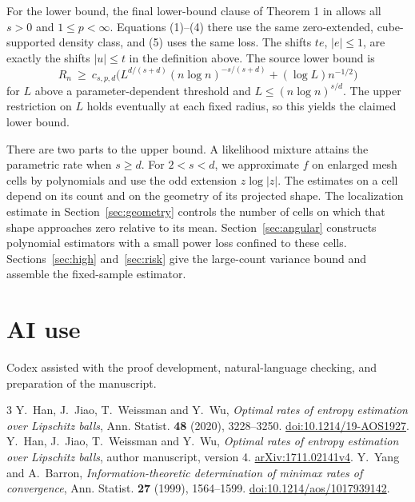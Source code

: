 \documentclass[11pt,reqno]{amsart}
\numberwithin{equation}{section}
\begin{document}
For the lower bound, the final lower-bound clause of Theorem 1 in
\cite{HJWWv4} allows all \(s>0\) and \(1\le p<\infty\).
Equations (1)--(4) there use the same zero-extended, cube-supported
density class, and (5) uses the same loss. The shifts \(te\), \(|e|\le1\),
are exactly the shifts \(|u|\le t\) in the definition above. The source lower bound is
\[
 R_n\ \ge\ c_{s,p,d}
 \bigl(L^{d/(s+d)}(n\log n)^{-s/(s+d)}+(\log L)n^{-1/2}\bigr)
\]
for \(L\) above a parameter-dependent threshold and
\(L\le(n\log n)^{s/d}\). The upper restriction on \(L\) holds
eventually at each fixed radius, so this yields the claimed lower bound.

There are two parts to the upper bound. A likelihood mixture
attains the parametric rate when \(s\ge d\). For \(2<s<d\), we
approximate \(f\) on enlarged mesh cells by polynomials and use
the odd extension \(z\log|z|\). The estimates on a cell depend
on its count and on the geometry of its projected shape. The
localization estimate in Section~\ref{sec:geometry} controls the
number of cells on which that shape approaches zero relative to
its mean. Section~\ref{sec:angular} constructs polynomial
estimators with a small power loss confined to these cells.
Sections~\ref{sec:high} and~\ref{sec:risk} give the large-count
variance bound and assemble the fixed-sample estimator.







\section*{AI use}
Codex assisted with the proof development, natural-language
checking, and preparation of the manuscript.

\begin{thebibliography}{3}
Y.~Han, J.~Jiao, T.~Weissman and Y.~Wu,
\textit{Optimal rates of entropy estimation over Lipschitz balls},
Ann. Statist. \textbf{48} (2020), 3228--3250.
\href{https://doi.org/10.1214/19-AOS1927}{doi:10.1214/19-AOS1927}.
Y.~Han, J.~Jiao, T.~Weissman and Y.~Wu,
\textit{Optimal rates of entropy estimation over Lipschitz balls},
author manuscript, version 4.
\href{https://arxiv.org/abs/1711.02141v4}{arXiv:1711.02141v4}.
Y.~Yang and A.~Barron,
\textit{Information-theoretic determination of minimax rates of
convergence}, Ann. Statist. \textbf{27} (1999), 1564--1599.
\href{https://doi.org/10.1214/aos/1017939142}{doi:10.1214/aos/1017939142}.
\end{thebibliography}
\end{document}
